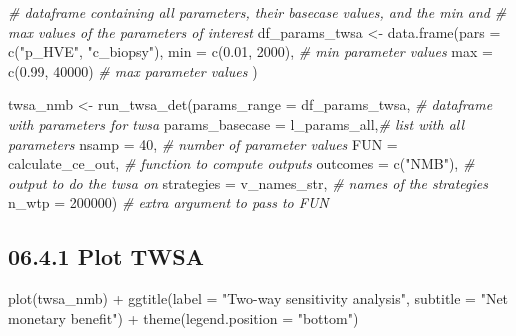 \documentclass[
]{article}
\newenvironment{Shaded}{\begin{snugshade}}{\end{snugshade}}
\newcommand{\AttributeTok}[1]{\textcolor[rgb]{0.77,0.63,0.00}{#1}}
\newcommand{\CommentTok}[1]{\textcolor[rgb]{0.56,0.35,0.01}{\textit{#1}}}
\newcommand{\DecValTok}[1]{\textcolor[rgb]{0.00,0.00,0.81}{#1}}
\newcommand{\FloatTok}[1]{\textcolor[rgb]{0.00,0.00,0.81}{#1}}
\newcommand{\FunctionTok}[1]{\textcolor[rgb]{0.00,0.00,0.00}{#1}}
\newcommand{\NormalTok}[1]{#1}
\newcommand{\OtherTok}[1]{\textcolor[rgb]{0.56,0.35,0.01}{#1}}
\newcommand{\SpecialCharTok}[1]{\textcolor[rgb]{0.00,0.00,0.00}{#1}}
\newcommand{\StringTok}[1]{\textcolor[rgb]{0.31,0.60,0.02}{#1}}
\begin{document}
\begin{Shaded}
\begin{Highlighting}[]
\CommentTok{\# dataframe containing all parameters, their basecase values, and the min and }
\CommentTok{\# max values of the parameters of interest}
\NormalTok{df\_params\_twsa }\OtherTok{\textless{}{-}} \FunctionTok{data.frame}\NormalTok{(}\AttributeTok{pars =} \FunctionTok{c}\NormalTok{(}\StringTok{"p\_HVE"}\NormalTok{, }\StringTok{"c\_biopsy"}\NormalTok{),}
                              \AttributeTok{min  =} \FunctionTok{c}\NormalTok{(}\FloatTok{0.01}\NormalTok{, }\DecValTok{2000}\NormalTok{), }\CommentTok{\# min parameter values}
                              \AttributeTok{max  =} \FunctionTok{c}\NormalTok{(}\FloatTok{0.99}\NormalTok{, }\DecValTok{40000}\NormalTok{) }\CommentTok{\# max parameter values}
\NormalTok{                              )}

\NormalTok{twsa\_nmb }\OtherTok{\textless{}{-}} \FunctionTok{run\_twsa\_det}\NormalTok{(}\AttributeTok{params\_range =}\NormalTok{ df\_params\_twsa, }\CommentTok{\# dataframe with parameters for twsa}
                         \AttributeTok{params\_basecase =}\NormalTok{ l\_params\_all,}\CommentTok{\# list with all parameters}
                         \AttributeTok{nsamp      =} \DecValTok{40}\NormalTok{,               }\CommentTok{\# number of parameter values}
                         \AttributeTok{FUN        =}\NormalTok{ calculate\_ce\_out, }\CommentTok{\# function to compute outputs}
                         \AttributeTok{outcomes   =} \FunctionTok{c}\NormalTok{(}\StringTok{"NMB"}\NormalTok{),         }\CommentTok{\# output to do the twsa on}
                         \AttributeTok{strategies =}\NormalTok{ v\_names\_str,      }\CommentTok{\# names of the strategies}
                         \AttributeTok{n\_wtp      =} \DecValTok{200000}\NormalTok{)           }\CommentTok{\# extra argument to pass to FUN}
\end{Highlighting}
\end{Shaded}

\hypertarget{plot-twsa}{%
\subsection{06.4.1 Plot TWSA}\label{plot-twsa}}

\begin{Shaded}
\begin{Highlighting}[]
\FunctionTok{plot}\NormalTok{(twsa\_nmb) }\SpecialCharTok{+} 
  \FunctionTok{ggtitle}\NormalTok{(}\AttributeTok{label =} \StringTok{"Two{-}way sensitivity analysis"}\NormalTok{, }
          \AttributeTok{subtitle =} \StringTok{"Net monetary benefit"}\NormalTok{) }\SpecialCharTok{+}
          \FunctionTok{theme}\NormalTok{(}\AttributeTok{legend.position =} \StringTok{"bottom"}\NormalTok{)}
\end{Highlighting}
\end{Shaded}
\end{document}
